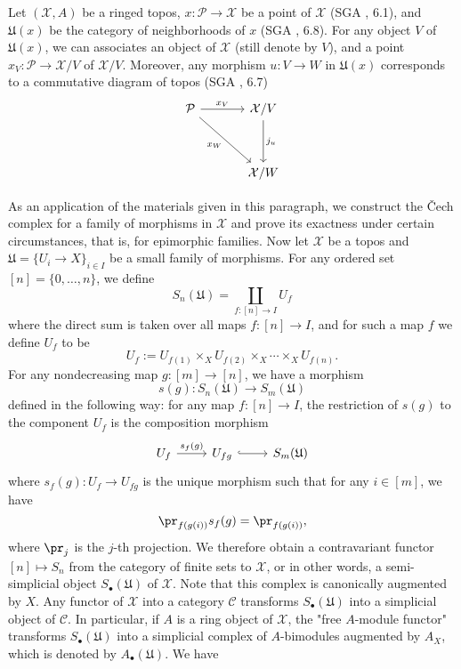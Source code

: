 Let $(\mathcal{X},A)$ be a ringed topos, $x:\mathcal{P}\to \mathcal{X}$ be a point of $\mathcal{X}$ (SGA , 6.1), and $\mathfrak{U}(x)$ be the category of neighborhoods of $x$ (SGA , 6.8). For any object $V$ of $\mathfrak{U}(x)$, we can associates an object of $\mathcal{X}$ (still denote by $V$), and a point $x_V:\mathcal{P}\to \mathcal{X}/V$ of $\mathcal{X}/V$. Moreover, any morphism $u:V\to W$ in $\mathfrak{U}(x)$ corresponds to a commutative diagram of topos (SGA , 6.7)
\[\begin{tikzcd}[row sep=12mm,column sep=12mm]
\mathcal{P}\ar[rd,swap,"x_W"]\ar[r,"x_V"]&\mathcal{X}/V\ar[d,"j_u"]\\
&\mathcal{X}/W
\end{tikzcd}\]

As an application of the materials given in this paragraph, we construct the \v{C}ech complex for a family of morphisms in $\mathcal{X}$ and prove its exactness under certain circumstances, that is, for epimorphic families. Now let $\mathcal{X}$ be a topos and $\mathfrak{U}=\{U_i\to X\}_{i\in I}$ be a small family of morphisms. For any ordered set $[n]=\{0,\dots,n\}$, we define
\[S_n(\mathfrak{U})=\coprod_{f:[n]\to I}U_f\]
where the direct sum is taken over all maps $f:[n]\to I$, and for such a map $f$ we define $U_f$ to be
\[U_f:=U_{f(1)}\times_XU_{f(2)}\times_X\cdots\times_XU_{f(n)}.\]
For any nondecreasing map $g:[m]\to [n]$, we have a morphism
\begin{equation}\label{ringed topos Cech complex for covering-1}
s(g):S_n(\mathfrak{U})\to S_m(\mathfrak{U})
\end{equation}
defined in the following way: for any map $f:[n]\to I$, the restriction of $s(g)$ to the component $U_f$ is the composition morphism
\[\begin{tikzcd}
U_f\ar[r,"s_f(g)"]&U_{fg}\ar[r,hook]&S_m(\mathfrak{U})
\end{tikzcd}\]
where $s_f(g):U_f\to U_{fg}$ is the unique morphism such that for any $i\in[m]$, we have 
\begin{equation}\label{ringed topos Cech complex for covering-2}
\pr_{f(g(i))}s_f(g)=\pr_{f(g(i))},
\end{equation}
where $\pr_j$ is the $j$-th projection. We therefore obtain a contravariant functor $[n]\mapsto S_n$ from the category of finite sets to $\mathcal{X}$, or in other words, a semi-simplicial object $S_\bullet(\mathfrak{U})$ of $\mathcal{X}$. Note that this complex is canonically augmented by $X$. Any functor of $\mathcal{X}$ into a category $\mathcal{C}$ transforms $S_\bullet(\mathfrak{U})$ into a simplicial object of $\mathcal{C}$. In particular, if $A$ is a ring object of $\mathcal{X}$, the "free $A$-module functor" transforms $S_\bullet(\mathfrak{U})$ into a simplicial complex of $A$-bimodules augmented by $A_X$, which is denoted by $A_\bullet(\mathfrak{U})$. We have
